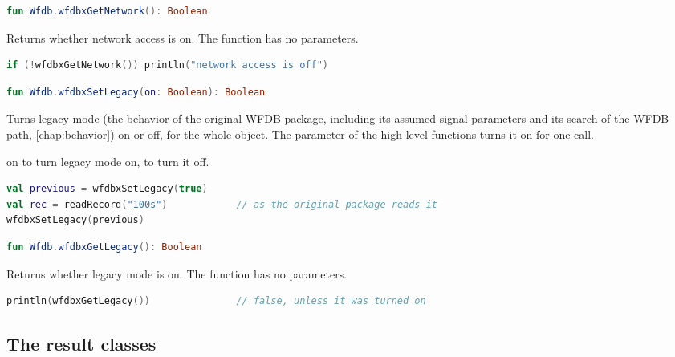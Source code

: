 \begin{lstlisting}[language=Kotlin,style=signature]
fun Wfdb.wfdbxGetNetwork(): Boolean
\end{lstlisting}
Returns whether network access is on. The function has no parameters.
\begin{lstlisting}[language=Kotlin]
if (!wfdbxGetNetwork()) println("network access is off")
\end{lstlisting}

\begin{lstlisting}[language=Kotlin,style=signature]
fun Wfdb.wfdbxSetLegacy(on: Boolean): Boolean
\end{lstlisting}
Turns legacy mode (the behavior of the original WFDB package, including its assumed
signal parameters and its search of the WFDB path, \cref{chap:behavior}) on or off, for
the whole  object. The parameter  of the high-level functions
turns it on for one call.
\begin{params}
\item[on]  to turn legacy mode on,  to turn it off.
\end{params}
\begin{lstlisting}[language=Kotlin]
val previous = wfdbxSetLegacy(true)
val rec = readRecord("100s")            // as the original package reads it
wfdbxSetLegacy(previous)
\end{lstlisting}

\begin{lstlisting}[language=Kotlin,style=signature]
fun Wfdb.wfdbxGetLegacy(): Boolean
\end{lstlisting}
Returns whether legacy mode is on. The function has no parameters.
\begin{lstlisting}[language=Kotlin]
println(wfdbxGetLegacy())               // false, unless it was turned on
\end{lstlisting}

\subsection{The result classes}
\label{sec:kotlin-results}

